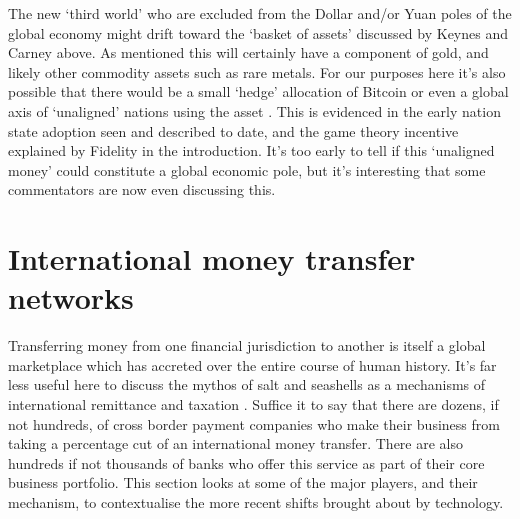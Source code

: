 The new `third world' who are excluded from the Dollar and/or Yuan poles of the global economy might drift toward the `basket of assets' discussed by Keynes and Carney above. As mentioned this will certainly have a component of gold, and likely other commodity assets such as rare metals. For our purposes here it's also possible that there would be a small `hedge' allocation of Bitcoin or even a global axis of `unaligned' nations using the asset \cite{hendrickson2021value}. This is evidenced in the early nation state adoption seen and described to date, and the game theory incentive explained by Fidelity in the introduction. It's too early to tell if this `unaligned money' could constitute a global economic pole, but it's interesting that some commentators are now even discussing this.

\section{International money transfer networks}
Transferring money from one financial jurisdiction to another is itself a global marketplace which has accreted over the entire course of human history. It's far less useful here to discuss the mythos of salt and seashells as a mechanisms of international remittance and taxation \cite{gainsford2017salt, goldberg2005famous}. Suffice it to say that there are dozens, if not hundreds, of cross border payment companies who make their business from taking a percentage cut of an international money transfer. There are also hundreds if not thousands of banks who offer this service as part of their core business portfolio. This section looks at some of the major players, and their mechanism, to contextualise the more recent shifts brought about by technology.
